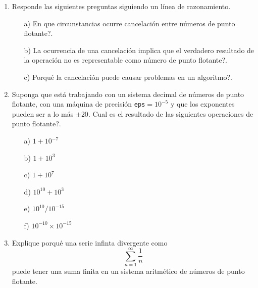 \documentclass[11pt]{article}
\begin{document}
\begin{enumerate}

\item Responde las siguientes preguntas siguiendo un l\'inea de razonamiento.
\begin{itemize}
 \item[a)]
\textquestiondown En que circunstancias ocurre cancelaci\'on entre n\'umeros de punto flotante?.
  \item[b)]
\textquestiondown La ocurrencia de una cancelaci\'on implica que el verdadero resultado de la operaci\'on 
no es representable como n\'umero de punto flotante?.
\item[c)]
\textquestiondown Porqu\'e la cancelaci\'on puede causar problemas en un algoritmo?.
\end{itemize}

\item Suponga que est\'a trabajando con un sistema decimal de n\'umeros de punto flotante, con una m\'aquina 
de precisi\'on \texttt{eps}$=10^{-5}$ y que los exponentes pueden ser a lo m\'as $\pm20$. \textquestiondown Cual 
es el resultado de las siguientes operaciones de punto flotante?.
\begin{multicols}{2}
\begin{itemize}
 \item[a)] $1+10^{-7}$
 \item[b)] $1+10^3$
 \item[c)] $1+10^7$
 \item[d)] $10^10+10^3$
 \item[e)] $10^{10}/10^{-15}$
 \item[f)] $10^{-10}\times 10^{-15}$
\end{itemize}
\end{multicols}

\item Explique porqu\'e una serie infinta divergente como
$$
\displaystyle 
\sum_{n=1}^\infty \frac{1}{n}
$$
puede tener una suma finita en un sistema aritm\'etico de n\'umeros de punto flotante.


\end{enumerate}
\end{document}
